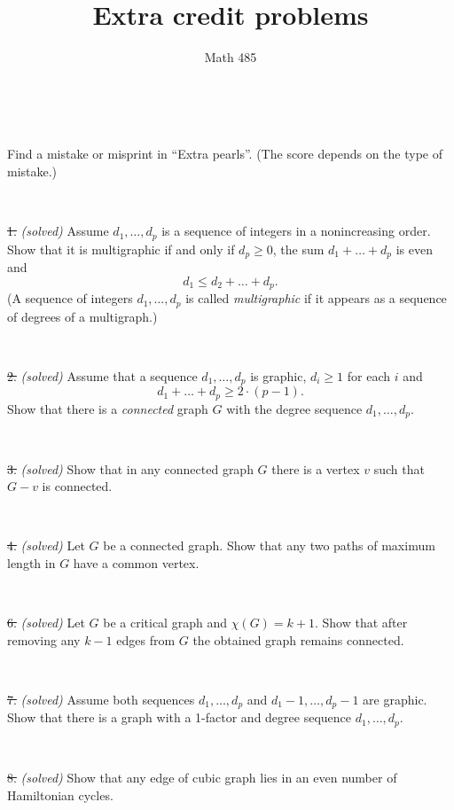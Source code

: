 \documentclass[oneside,a4paper]{article}
\begin{document}
%
\title{Extra credit problems}
\author{Math 485}
\date{}
\maketitle

\textit{}


\ 

 Find a mistake or misprint in ``Extra pearls''.
(The score depends on the type of mistake.)


\ 

\noindent \sout{1.} \textit{(solved)}
Assume $d_1,\dots, d_p$ is a sequence of integers in a nonincreasing order.
Show that it is multigraphic if and only if $d_p\ge0$, the sum $d_1+\dots+ d_p$ is even and 
\[d_1\le d_2+\dots+d_p.\]
(A sequence of integers $d_1,\dots, d_p$ is called \textit{multigraphic} if it appears as a sequence of degrees of a multigraph.)

\ 

\noindent \sout{2.} \textit{(solved)}
Assume that a sequence $d_1,\dots, d_p$ is graphic,
$d_i\ge 1$ for each $i$ and 
\[d_1+\dots+d_p\ge 2\cdot(p-1).\]
Show that there is a \textit{connected} graph $G$ with the degree sequence $d_1,\dots, d_p$.


\ 

\noindent 
\sout{3.} \textit{(solved)}
Show that in any connected graph $G$ there is a vertex $v$ such that $G-v$ is connected.

\ 


\noindent
\sout{4.} \textit{(solved)}
Let $G$ be a  connected graph.
Show that any two paths of maximum length in $G$ have a common vertex.

\ 

\noindent 
\sout{6.} \textit{(solved)}
Let $G$ be a critical graph and $\chi(G)=k+1$.
Show that after removing any $k-1$ edges from $G$  
the obtained graph remains connected. 

\ 

\noindent %
\sout{7.} \textit{(solved)}
Assume both sequences $d_1,\dots, d_p$
 and $d_1-1,\dots, d_p-1$ are graphic.
Show that there is a graph with a 1-factor and degree sequence $d_1,\dots, d_p$.


\ 

\noindent %
\sout{8.} \textit{(solved)}
Show that any edge of cubic graph lies in an even number of Hamiltonian cycles.


\ 
\end{document}
